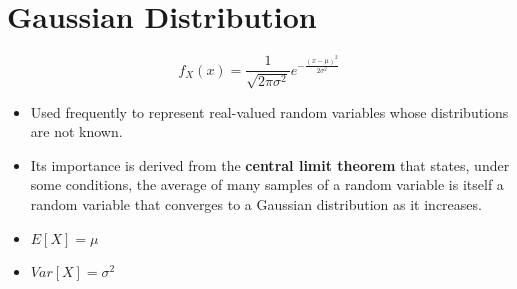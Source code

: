 \documentclass[
  letterpaper,
  DIV=11,
  numbers=noendperiod]{scrreprt}
\providecommand{\tightlist}{%
  \setlength{\itemsep}{0pt}\setlength{\parskip}{0pt}}\usepackage{longtable,booktabs,array}
\begin{document}
\section{Gaussian Distribution}\label{gaussian-distribution}

\[
f_{X}(x)=\frac{1}{\sqrt{2\pi\sigma^{2} }}e^{-\frac{(x-\mu)^{2}}{2\sigma^{2}}}
\]

\begin{itemize}
\tightlist
\item
  Used frequently to represent real-valued random variables whose
  distributions are not known.
\item
  Its importance is derived from the \textbf{central limit theorem} that
  states, under some conditions, the average of many samples of a random
  variable is itself a random variable that converges to a Gaussian
  distribution as it increases.
\item
  \(E[X] = \mu\)
\item
  \(Var[X] = \sigma^{2}\)
\end{itemize}
\end{document}
